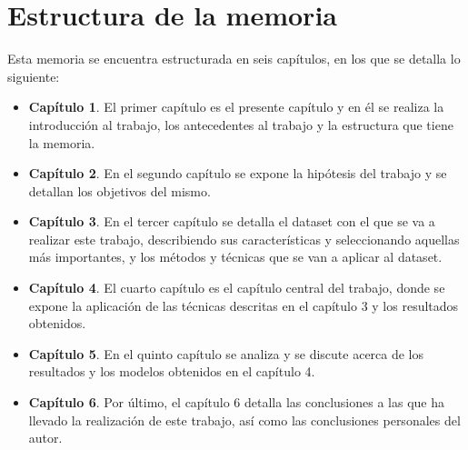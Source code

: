 \section{Estructura de la memoria}

Esta memoria se encuentra estructurada en seis capítulos, en los que se detalla lo siguiente:

\begin{itemize}
 \item \textbf{Capítulo 1}. El primer capítulo es el presente capítulo y en él se realiza la introducción al trabajo, los antecedentes al trabajo y la estructura que tiene la memoria.
 
 \item \textbf{Capítulo 2}. En el segundo capítulo se expone la hipótesis del trabajo y se detallan los objetivos del mismo.
 
 \item \textbf{Capítulo 3}. En el tercer capítulo se detalla el dataset con el que se va a realizar este trabajo, describiendo sus características y seleccionando aquellas más importantes, y los métodos y técnicas que se van a aplicar al dataset. 
 
 \item \textbf{Capítulo 4}. El cuarto capítulo es el capítulo central del trabajo, donde se expone la aplicación de las técnicas descritas en el capítulo 3 y los resultados obtenidos.
 
 \item \textbf{Capítulo 5}. En el quinto capítulo se analiza y se discute acerca de los resultados y los modelos obtenidos en el capítulo 4.
 
 \item \textbf{Capítulo 6}. Por último, el capítulo 6 detalla las conclusiones a las que ha llevado la realización de este trabajo, así como las conclusiones personales del autor.
\end{itemize}



















